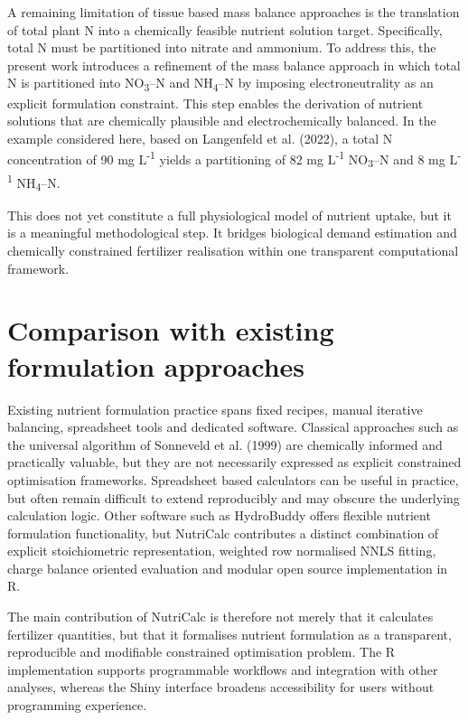\documentclass[
  letterpaper,
  DIV=11,
  numbers=noendperiod]{scrreprt}
\begin{document}
A remaining limitation of tissue based mass balance approaches is the
translation of total plant N into a chemically feasible nutrient
solution target. Specifically, total N must be partitioned into nitrate
and ammonium. To address this, the present work introduces a refinement
of the mass balance approach in which total N is partitioned into
NO\textsubscript{3}--N and NH\textsubscript{4}--N by imposing
electroneutrality as an explicit formulation constraint. This step
enables the derivation of nutrient solutions that are chemically
plausible and electrochemically balanced. In the example considered
here, based on Langenfeld et al. (2022), a total N concentration of 90
mg L\textsuperscript{-1} yields a partitioning of 82 mg
L\textsuperscript{-1} NO\textsubscript{3}--N and 8 mg
L\textsuperscript{-1} NH\textsubscript{4}--N.

This does not yet constitute a full physiological model of nutrient
uptake, but it is a meaningful methodological step. It bridges
biological demand estimation and chemically constrained fertilizer
realisation within one transparent computational framework.

\section{Comparison with existing formulation
approaches}\label{comparison-with-existing-formulation-approaches}

Existing nutrient formulation practice spans fixed recipes, manual
iterative balancing, spreadsheet tools and dedicated software. Classical
approaches such as the universal algorithm of Sonneveld et al. (1999)
are chemically informed and practically valuable, but they are not
necessarily expressed as explicit constrained optimisation frameworks.
Spreadsheet based calculators can be useful in practice, but often
remain difficult to extend reproducibly and may obscure the underlying
calculation logic. Other software such as HydroBuddy offers flexible
nutrient formulation functionality, but NutriCalc contributes a distinct
combination of explicit stoichiometric representation, weighted row
normalised NNLS fitting, charge balance oriented evaluation and modular
open source implementation in R.

The main contribution of NutriCalc is therefore not merely that it
calculates fertilizer quantities, but that it formalises nutrient
formulation as a transparent, reproducible and modifiable constrained
optimisation problem. The R implementation supports programmable
workflows and integration with other analyses, whereas the Shiny
interface broadens accessibility for users without programming
experience.
\end{document}
